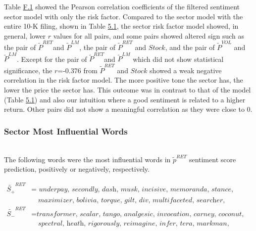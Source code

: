 \documentclass[logo,bsc,singlespacing,parskip]{infthesis}
\begin{document}
Table \hyperref[tab:risk_qqq_corr]{F.1} showed the Pearson correlation coefficients of the filtered sentiment sector model with only the risk factor. Compared to the sector model with the entire 10-K filing, shown in Table \hyperref[tab:all_qqq_corr2]{5.1}, the sector risk factor model showed, in general, lower $r$ values for all pairs, and some pairs showed altered sign such as the pair of $\tilde{P}^{RET}$and $\tilde{P}^{LM}$, the pair of $\tilde{P}^{RET}$ and $Stock$, and the pair of $\tilde{P}^{VOL}$ and $\tilde{P}^{LM}$. Except for the pair of $\tilde{P}^{RET}$and $\tilde{P}^{LM}$ which did not show statistical significance, the $r$=-0.376 from $\tilde{P}^{RET}$ and $Stock$ showed a weak negative correlation in the risk factor model. The more positive tone the sector has, the lower the price the sector has. This outcome was in contrast to that of the model (Table \hyperref[tab:all_qqq_corr2]{5.1}) and also our intuition where a good sentiment is related to a higher return. Other pairs did not show a meaningful correlation as they were close to 0.




\subsubsection{Sector Most Influential Words}

\label{word_all_qqq}
\\
The following words were the most influential words in $\tilde{p}^{RET}$ sentiment score prediction, positively or negatively, respectively.

\begin{align*}
\tilde{S_{+}}^{RET} &= \textit{ underpay, secondly, dash, musk, incisive, memoranda, stance,} \\
               &\quad \textit{maximizer, bolivia, torque, gilt, div, multifaceted, searcher, formulaic} \\
\tilde{S_{-}}^{RET} &= \textit{transformer, scalar, tango, analgesic, invocation, carney, coconut,} \\
               &\quad \textit{spectral, heath, rigorously, reimagine, infer, tera, markman, enclosure}
\end{align*}
\end{document}
